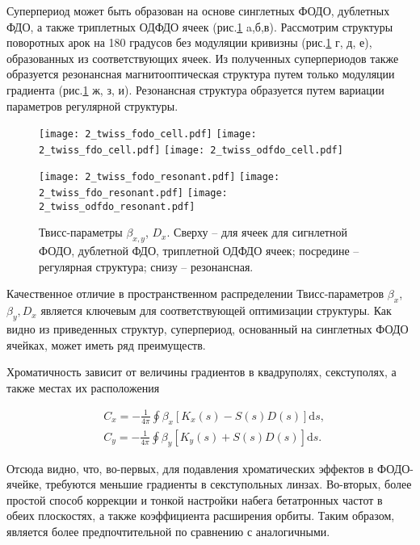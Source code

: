 \par Суперпериод может быть образован на основе синглетных ФОДО, дублетных ФДО, а также триплетных ОДФДО ячеек (рис.\ref{fig:fodo_fdo_odfdo} a,б,в). Рассмотрим структуры поворотных арок на 180 градусов без модуляции кривизны (рис.\ref{fig:fodo_fdo_odfdo} г, д, е), образованных из соответствующих ячеек. Из полученных суперпериодов также образуется резонансная магнитооптическая структура путем только модуляции градиента (рис.\ref{fig:fodo_fdo_odfdo} ж, з, и). Резонансная структура образуется путем вариации параметров регулярной структуры.

\begin{figure} [h!]

   \texttt{[image: 2\_twiss\_fodo\_cell.pdf]}
   \texttt{[image: 2\_twiss\_fdo\_cell.pdf]}
   \texttt{[image: 2\_twiss\_odfdo\_cell.pdf]}

   \texttt{[image: 2\_twiss\_fodo\_resonant.pdf]}
   \texttt{[image: 2\_twiss\_fdo\_resonant.pdf]}
   \texttt{[image: 2\_twiss\_odfdo\_resonant.pdf]}

   \caption{Твисс-параметры $\beta_{x,y}$, $D_{x}$. Сверху -- для ячеек для сигнлетной ФОДО, дублетной ФДО, триплетной ОДФДО ячеек; посредине -- регулярная структура; снизу -- резонансная.}
   \label{fig:fodo_fdo_odfdo}
\end{figure}

\par Качественное отличие в пространственном распределении Твисс-параметров $\beta_{x}$, $\beta_{y}, D_{x}$ является ключевым для соответствующей оптимизации структуры.
Как видно из приведенных структур, суперпериод, основанный на синглетных ФОДО ячейках, может иметь ряд преимуществ.

\noindent Хроматичность зависит от величины градиентов в квадруполях, секступолях, а также местах их расположения \cite{lee}

\begin{equation}
\begin{aligned}
& C_x=-\frac{1}{4 \pi} \oint \beta_x\left[K_x(s)-S(s) D(s)\right] \textrm{d} s, \\
& C_y=-\frac{1}{4 \pi} \oint \beta_y\left[K_y(s)+S(s) D(s)\right] \textrm{d} s.
\end{aligned}
\end{equation}

\noindent Отсюда видно, что, во-первых, для подавления хроматических эффектов в ФОДО-ячейке, требуются меньшие градиенты в секступольных линзах. Во-вторых, более простой способ коррекции и тонкой настройки набега бетатронных частот в обеих плоскостях, а также коэффициента расширения орбиты. Таким образом, является более предпочтительной по сравнению с аналогичными.

